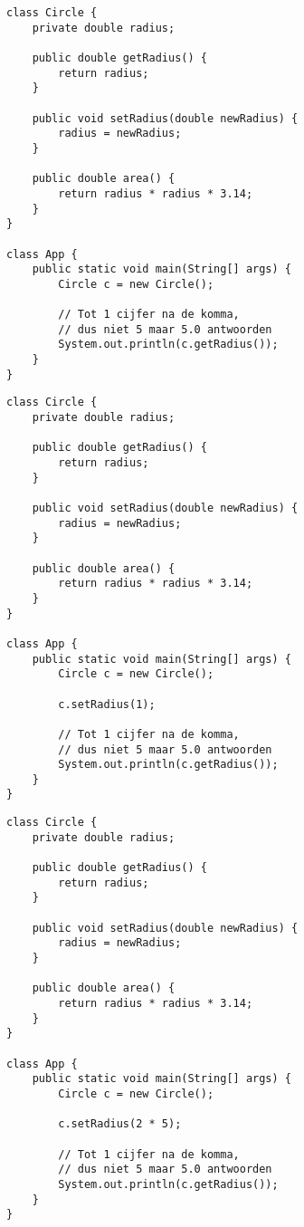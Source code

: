 \documentclass[a4paper]{article}
\begin{document}
\begin{lstlisting}
class Circle {
    private double radius;

    public double getRadius() {
        return radius;
    }

    public void setRadius(double newRadius) {
        radius = newRadius;
    }

    public double area() {
        return radius * radius * 3.14;
    }
}

class App {
    public static void main(String[] args) {
        Circle c = new Circle();

        // Tot 1 cijfer na de komma,
        // dus niet 5 maar 5.0 antwoorden
        System.out.println(c.getRadius());
    }
}
\end{lstlisting}\clearpage

\begin{lstlisting}
class Circle {
    private double radius;

    public double getRadius() {
        return radius;
    }

    public void setRadius(double newRadius) {
        radius = newRadius;
    }

    public double area() {
        return radius * radius * 3.14;
    }
}

class App {
    public static void main(String[] args) {
        Circle c = new Circle();
        
        c.setRadius(1);

        // Tot 1 cijfer na de komma,
        // dus niet 5 maar 5.0 antwoorden
        System.out.println(c.getRadius());
    }
}
\end{lstlisting}\clearpage

\begin{lstlisting}
class Circle {
    private double radius;

    public double getRadius() {
        return radius;
    }

    public void setRadius(double newRadius) {
        radius = newRadius;
    }

    public double area() {
        return radius * radius * 3.14;
    }
}

class App {
    public static void main(String[] args) {
        Circle c = new Circle();
        
        c.setRadius(2 * 5);

        // Tot 1 cijfer na de komma,
        // dus niet 5 maar 5.0 antwoorden
        System.out.println(c.getRadius());
    }
}
\end{lstlisting}\clearpage
\end{document}
